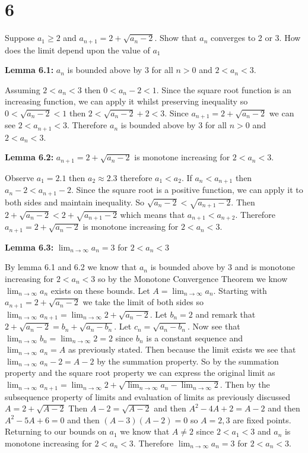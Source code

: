 \documentclass[10pt,letterpaper]{article}
\newcommand\ds{\displaystyle}
\begin{document}
{\section*{6} Suppose $a_1 \geq 2$ and $a_{n +1} = 2 + \sqrt{a_n - 2}$. Show that $a_n$ converges to 2 or 3. How does the limit depend upon the value of $a_1$

\medskip

\textbf{Lemma 6.1:} $a_n$ is bounded above by $3$ for all $n > 0$ and $2 < a_n < 3$.

Assuming $2 < a_n < 3$ then $0 < a_n - 2 < 1$. Since the square root function is an increasing function, we can apply it whilst preserving inequality so $0 < \sqrt{a_n - 2} < 1$ then $2 < \sqrt{a_n - 2} + 2 < 3$. Since
$a_{n +1} = 2 + \sqrt{a_n - 2}$ we can see $2 < a_{n+1} < 3$. Therefore $a_n$ is bounded above by $3$ for all $n > 0$ and $2 < a_n < 3$.

\medskip

\textbf{Lemma 6.2:} $a_{n +1} = 2 + \sqrt{a_n - 2}$ is monotone increasing for $2 < a_n < 3$.

Observe $a_1 = 2.1$ then $a_2 \approx 2.3$ therefore $a_1 < a_2$. If $a_n < a_{n+1}$ then $a_n - 2 < a_{n+1} - 2$. Since the square root is a positive function, we can apply it to both sides and maintain inequality. So $\sqrt{a_n - 2} < \sqrt{a_{n+1} - 2}$. Then $2 + \sqrt{a_n - 2} < 2 + \sqrt{a_{n+1} - 2}$ which means that $a_{n+1} < a_{n+2}$. Therefore $a_{n +1} = 2 + \sqrt{a_n - 2}$ is monotone increasing for $2 < a_n < 3$.

\medskip

\textbf{Lemma 6.3:} $\ds \lim_{n\to\infty}a_n = 3$ for $2 < a_n < 3$

By lemma 6.1 and 6.2 we know that $a_n$ is bounded above by $3$ and is monotone increasing for $2 < a_n < 3$ so by the Monotone Convergence Theorem we know $\ds \lim_{n\to\infty}a_n$ exists on these bounds.
Let $A = \ds \lim_{n\to\infty} a_n$.
Starting with $a_{n+1} = 2 + \sqrt{a_n - 2}$ we take the limit of both sides so $\ds\lim_{n\to\infty}a_{n+1} = \ds\lim_{n\to\infty} 2 + \sqrt{a_n - 2}$.
Let $b_n = 2$ and remark that $2 + \sqrt{a_n - 2} = b_n + \sqrt{a_n - b_n}$.
Let $c_n = \sqrt{a_n - b_n}$.
Now see that $\ds\lim_{n\to\infty} b_n = \ds\lim_{n\to\infty} 2 = 2$ since $b_n$ is a constant sequence and $\ds\lim_{n\to\infty} a_n = A$ as previously stated.
Then because the limit exists we see that $\ds\lim_{n\to\infty} a_n - 2 = A - 2$ by the summation property.
So by the summation property and the square root property we can express the original limit as $\ds\lim_{n\to\infty} a_{n+1} = \ds\lim_{n\to\infty} 2 + \sqrt{\ds\lim_{n\to\infty}a_n - \ds\lim_{n\to\infty}2}$.
Then by the subsequence property of limits and evaluation of limits as previously discussed $A = 2 + \sqrt{A - 2}$
Then $A - 2 = \sqrt{A - 2}$ and then $A^2 - 4A + 2 = A - 2$ and then $A^2 - 5A + 6 = 0$ and then $(A - 3)(A - 2) = 0$ so $A = 2,3$ are fixed points. Returning to our bounds on $a_1$ we know that $A \neq 2$ since $2 < a_1 < 3$ and $a_n$ is monotone increasing for $2 < a_n < 3$. Therefore $\ds \lim_{n\to\infty}a_n = 3$ for $2 < a_n < 3$.

}
\end{document}
